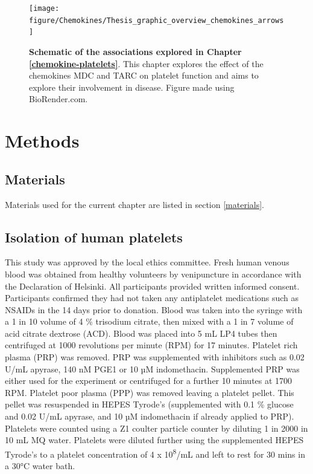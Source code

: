 \documentclass[11pt,twoside]{bristolthesis}
\begin{document}
\begin{figure}

{\centering \texttt{[image: figure/Chemokines/Thesis\_graphic\_overview\_chemokines\_arrows]} 

}

\caption[Schematic of the associations explored in Chapter \ref{chemokine-platelets}]{\textbf{Schematic of the associations explored in Chapter \ref{chemokine-platelets}}. This chapter explores the effect of the chemokines MDC and TARC on platelet function and aims to explore their involvement in disease. Figure made using BioRender.com.}\label{fig:chemokine-platelet-graphic}
\end{figure}
\hypertarget{methods-1}{%
\section{Methods}\label{methods-1}}

\hypertarget{materials-1}{%
\subsection{Materials}\label{materials-1}}

Materials used for the current chapter are listed in section \ref{materials}.

\hypertarget{isolation-of-human-platelets}{%
\subsection{Isolation of human platelets}\label{isolation-of-human-platelets}}

This study was approved by the local ethics committee. Fresh human venous blood was obtained from healthy volunteers by venipuncture in accordance with the Declaration of Helsinki. All participants provided written informed consent. Participants confirmed they had not taken any antiplatelet medications such as NSAIDs in the 14 days prior to donation. Blood was taken into the syringe with a 1 in 10 volume of 4 \% trisodium citrate, then mixed with a 1 in 7 volume of acid citrate dextrose (ACD). Blood was placed into 5 mL LP4 tubes then centrifuged at 1000 revolutions per minute (RPM) for 17 minutes. Platelet rich plasma (PRP) was removed. PRP was supplemented with inhibitors such as 0.02 U/mL apyrase, 140 nM PGE1 or 10 µM indomethacin. Supplemented PRP was either used for the experiment or centrifuged for a further 10 minutes at 1700 RPM. Platelet poor plasma (PPP) was removed leaving a platelet pellet. This pellet was resuspended in HEPES Tyrode's (supplemented with 0.1 \% glucose and 0.02 U/mL apyrase, and 10 µM indomethacin if already applied to PRP). Platelets were counted using a Z1 coulter particle counter by diluting 1 in 2000 in 10 mL MQ water. Platelets were diluted further using the supplemented HEPES Tyrode's to a platelet concentration of 4 x 10\textsuperscript{8}/mL and left to rest for 30 mins in a 30°C water bath.
\end{document}
